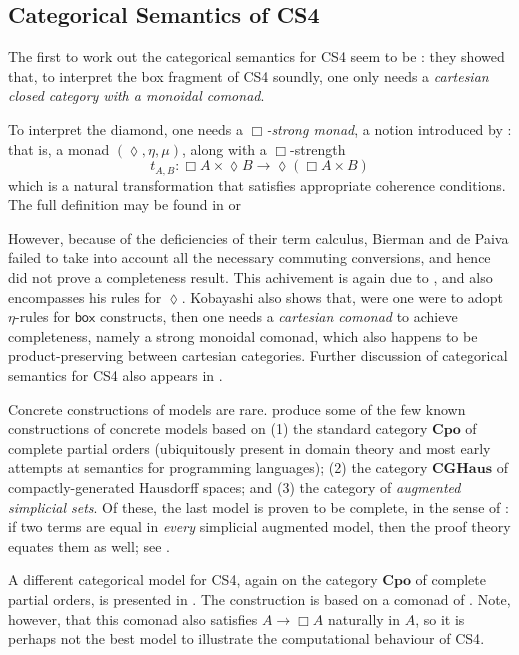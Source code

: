 \documentclass[a4paper]{amsart}
\begin{document}
\subsection{Categorical Semantics of \textsf{CS4}}

The first to work out the categorical semantics for \textsf{CS4}
seem to be \cite{Bierman1992a, Bierman1996a, Bierman2000a}: they
showed that, to interpret the box fragment of \textsf{CS4}
soundly, one only needs a \emph{cartesian closed category with a
monoidal comonad}.

To interpret the diamond, one needs a \emph{$\Box$-strong monad},
a notion introduced by \cite{Kobayashi1997}:  that is, a monad
$(\lozenge, \eta, \mu)$, along with a $\Box$-strength \[ t_{A, B}:
  \Box A \times \lozenge B \rightarrow \lozenge (\Box A \times B)
\] which is a natural transformation that satisfies appropriate
coherence conditions. The full definition may be found in
\citep{Kobayashi1997} or \citep{Bierman2000a}

However, because of the deficiencies of their term calculus,
Bierman and de Paiva failed to take into account all the necessary
commuting conversions, and hence did not prove a completeness
result. This achivement is again due to \cite{Kobayashi1997}, and
also encompasses his rules for $\lozenge$. Kobayashi also shows
that, were one were to adopt $\eta$-rules for $\textsf{box}$
constructs, then one needs a \emph{cartesian comonad} to achieve
completeness, namely a strong monoidal comonad, which also happens
to be product-preserving between cartesian categories. Further
discussion of categorical semantics for \textsf{CS4} also appears
in \citep{Alechina2001}.

Concrete constructions of models are rare.
\cite{Goubault-Larrecq1999a, Goubault-Larrecq1999b,
Goubault-Larrecq2003} produce some of the few known constructions
of concrete models based on (1) the standard category
$\mathbf{Cpo}$ of complete partial orders (ubiquitously present in
domain theory and most early attempts at semantics for programming
languages); (2) the category $\mathbf{CGHaus}$ of
compactly-generated Hausdorff spaces; and (3) the category of
\emph{augmented simplicial sets}. Of these, the last model is
proven to be complete, in the sense of \cite{Friedman1975}: if two
terms are equal in \emph{every} simplicial augmented model, then
the proof theory equates them as well; see
\citep{Goubault-Larrecq2003}.

A different categorical model for \textsf{CS4}, again on the
category $\mathbf{Cpo}$ of complete partial orders, is presented
in \citep{Kobayashi1997}. The construction is based on a comonad
of \cite{Brookes1991, Brookes1992}. Note, however, that this
comonad also satisfies $A \rightarrow \Box A$ naturally in $A$, so
it is perhaps not the best model to illustrate the computational
behaviour of \textsf{CS4}.
\end{document}
